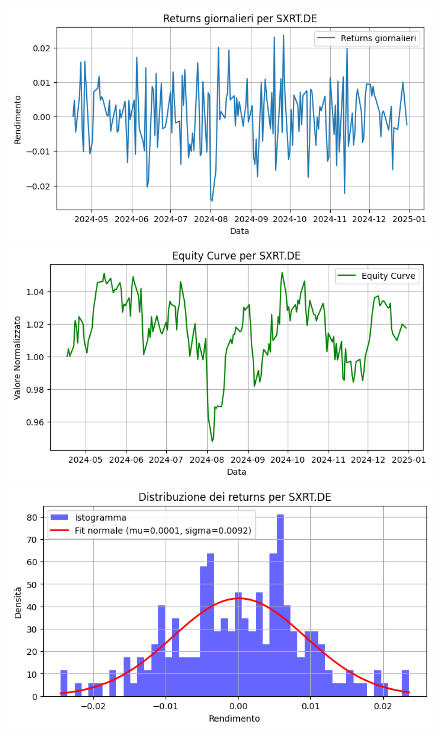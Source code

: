 \documentclass{article}%
\begin{document}
\begin{figure}[htbp]%
\begin{minipage}{0.31\textwidth}%
\includegraphics[width=\linewidth]{immagini_tickers/SXRT.DE_returns_plot.png}%
\end{minipage}%
\begin{minipage}{0.31\textwidth}%
\includegraphics[width=\linewidth]{immagini_tickers/SXRT.DE_equity_curve.png}%
\end{minipage}%
\begin{minipage}{0.31\textwidth}%
\includegraphics[width=\linewidth]{immagini_tickers/SXRT.DE_distribuzione_returns.png}%
\end{minipage}%
\end{figure}
\end{document}
